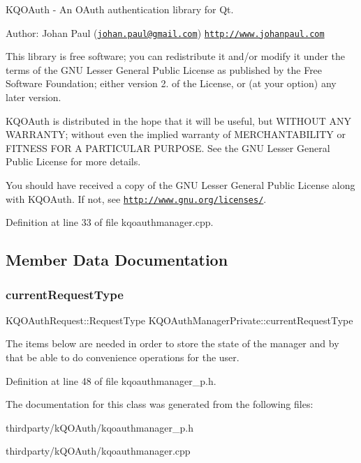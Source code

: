 K\+Q\+O\+Auth -\/ An O\+Auth authentication library for Qt.

Author\+: Johan Paul (\href{mailto:johan.paul@gmail.com}{\tt johan.\+paul@gmail.\+com}) \href{http://www.johanpaul.com}{\tt http\+://www.\+johanpaul.\+com}

This library is free software; you can redistribute it and/or modify it under the terms of the G\+NU Lesser General Public License as published by the Free Software Foundation; either version 2. of the License, or (at your option) any later version.

K\+Q\+O\+Auth is distributed in the hope that it will be useful, but W\+I\+T\+H\+O\+UT A\+NY W\+A\+R\+R\+A\+N\+TY; without even the implied warranty of M\+E\+R\+C\+H\+A\+N\+T\+A\+B\+I\+L\+I\+TY or F\+I\+T\+N\+E\+SS F\+OR A P\+A\+R\+T\+I\+C\+U\+L\+AR P\+U\+R\+P\+O\+SE. See the G\+NU Lesser General Public License for more details.

You should have received a copy of the G\+NU Lesser General Public License along with K\+Q\+O\+Auth. If not, see \href{http://www.gnu.org/licenses/}{\tt http\+://www.\+gnu.\+org/licenses/}. 

Definition at line 33 of file kqoauthmanager.\+cpp.



\subsection{Member Data Documentation}
\mbox{\label{class_k_q_o_auth_manager_private_a2f70ace00de205f3d1f1bf79d1987bb0}} 
\subsubsection{\texorpdfstring{current\+Request\+Type}{currentRequestType}}
{\footnotesize\ttfamily K\+Q\+O\+Auth\+Request\+::\+Request\+Type K\+Q\+O\+Auth\+Manager\+Private\+::current\+Request\+Type}

The items below are needed in order to store the state of the manager and by that be able to do convenience operations for the user. 

Definition at line 48 of file kqoauthmanager\+\_\+p.\+h.



The documentation for this class was generated from the following files\+:\begin{DoxyCompactItemize}
\item 
thirdparty/k\+Q\+O\+Auth/kqoauthmanager\+\_\+p.\+h\item 
thirdparty/k\+Q\+O\+Auth/kqoauthmanager.\+cpp\end{DoxyCompactItemize}
